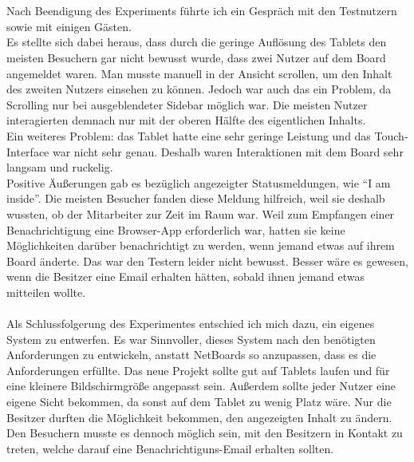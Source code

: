 \\
\\
Nach Beendigung des Experiments führte ich ein Gespräch mit den Testnutzern sowie mit einigen Gästen.
\\
Es stellte sich dabei heraus, dass durch die geringe Auflösung des Tablets den meisten Besuchern gar nicht bewusst wurde, dass zwei Nutzer auf dem Board angemeldet waren. Man musste manuell in der Ansicht scrollen, um den Inhalt des zweiten Nutzers einsehen zu können. Jedoch war auch das ein Problem, da Scrolling nur bei ausgeblendeter Sidebar möglich war. Die meisten Nutzer interagierten demnach nur mit der oberen Hälfte des eigentlichen Inhalts.
\\
Ein weiteres Problem: das Tablet hatte eine sehr geringe Leistung und das Touch-Interface war nicht sehr genau. Deshalb waren Interaktionen mit dem Board sehr langsam und ruckelig.
\\
Positive Äußerungen gab es bezüglich angezeigter Statusmeldungen, wie \bspw ``I am inside''. Die meisten Besucher fanden diese Meldung hilfreich, weil sie deshalb wussten, ob der Mitarbeiter zur Zeit im Raum war.
Weil zum Empfangen einer Benachrichtigung eine Browser-App erforderlich war, hatten sie keine Möglichkeiten darüber benachrichtigt zu werden, wenn jemand etwas auf ihrem Board änderte. Das war den Testern leider nicht bewusst.
Besser wäre es gewesen, wenn die Besitzer eine Email erhalten hätten, sobald ihnen jemand etwas mitteilen wollte.
\\
\\
Als Schlussfolgerung des Experimentes entschied ich mich dazu, ein eigenes System zu entwerfen.
Es war Sinnvoller, dieses System nach den benötigten Anforderungen zu entwickeln, anstatt NetBoards so anzupassen, dass es die Anforderungen erfüllte.
Das neue Projekt sollte gut auf Tablets laufen und für eine kleinere Bildschirmgröße angepasst sein.
Außerdem sollte jeder Nutzer eine eigene Sicht bekommen, da sonst auf dem Tablet zu wenig Platz wäre.
Nur die Besitzer durften die Möglichkeit bekommen, den angezeigten Inhalt zu ändern.
Den Besuchern musste es dennoch möglich sein, mit den Besitzern in Kontakt zu treten, welche darauf eine Benachrichtiguns-Email erhalten sollten.
